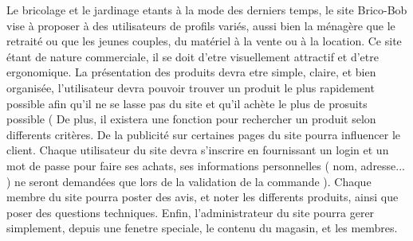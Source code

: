 Le bricolage et le jardinage etants à la mode des derniers temps, le site Brico-Bob vise à proposer à des utilisateurs de profils variés, aussi bien
la ménagère que le retraité ou que les jeunes couples, du matériel à la vente ou à la location.
Ce site étant de nature commerciale, il se doit d'etre visuellement attractif et d'etre ergonomique. La présentation des produits devra etre simple, claire, et 
bien organisée, l'utilisateur devra pouvoir trouver un produit le plus rapidement possible afin qu'il ne se lasse pas du site et qu'il achète le plus de prosuits
possible ( De plus, il existera une fonction pour rechercher un produit selon differents critères. De la publicité sur certaines pages du site pourra influencer
le client.
Chaque utilisateur du site devra s'inscrire en fournissant un login et un mot de passe pour  faire ses achats, ses informations personnelles ( nom, adresse... )
ne seront demandées que lors de la validation de la commande ). Chaque membre du site pourra poster des avis, et noter les differents produits, ainsi que poser
des questions techniques.
Enfin, l'administrateur du site pourra gerer simplement, depuis une fenetre speciale, le contenu du magasin, et les membres.
